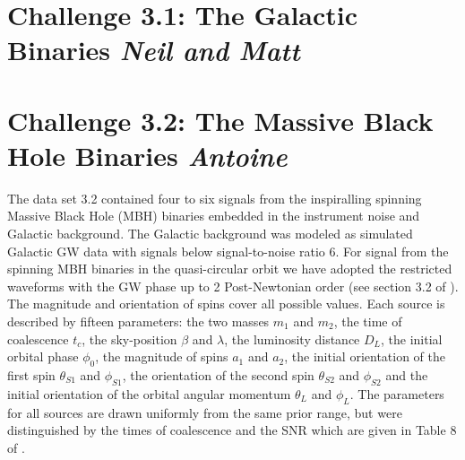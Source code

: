 \documentclass{iopart}
\begin{document}

\section{Challenge 3.1: The Galactic Binaries {\it Neil and Matt}}

\section{Challenge 3.2: The Massive Black Hole Binaries {\it Antoine}}
The data set 3.2 contained four to six signals from the inspiralling spinning Massive Black Hole (MBH) binaries embedded in the instrument noise and Galactic background. The Galactic background was modeled as simulated 
Galactic GW data with signals below signal-to-noise ratio 6. 
For signal from the spinning MBH binaries in the quasi-circular orbit we have adopted the restricted waveforms with 
the GW phase up to 2 Post-Newtonian order (see section 3.2 of \cite{MLDC3}). The magnitude and orientation of spins cover all possible values.  Each source is described by fifteen parameters: the two masses $m_{1}$ and $m_{2}$, the time of coalescence $t_{c}$, the sky-position $\beta$ and $\lambda$, the luminosity distance $D_{L}$, the initial orbital phase $\phi_{0}$, the magnitude of spins $a_{1}$ and $a_{2}$, the initial orientation of the first spin  $\theta_{S1}$ and $\phi_{S1}$, the orientation of the second spin $\theta_{S2}$ and $\phi_{S2}$ and the initial orientation of the orbital angular momentum  $\theta_{L}$ and $\phi_{L}$. The parameters for all sources are drawn uniformly from the 
same prior range, but were distinguished by the times of coalescence and the SNR which are given in Table 8 of \cite{MLDC3}.
\end{document}
